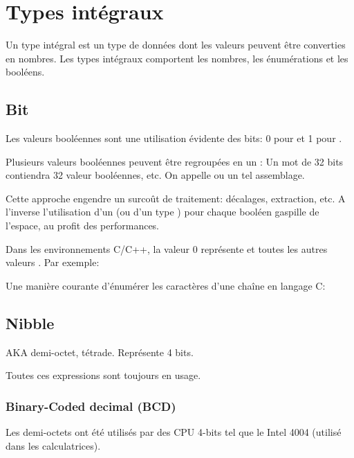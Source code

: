 ﻿%
\section{Types intégraux}

Un type intégral est un type de données dont les valeurs peuvent être converties en nombres.
Les types intégraux comportent les nombres, les énumérations et les booléens.

\subsection{Bit}

Les valeurs booléennes sont une utilisation évidente des bits: 0 pour  et 1 pour .

Plusieurs valeurs booléennes peuvent être regroupées en un : Un mot de 32 bits contiendra 32 valeur booléennes, etc.
On appelle  ou  un tel assemblage.

Cette approche engendre un surcoût de traitement: décalages, extraction, etc.
A l'inverse l'utilisation d'un  (ou d'un type ) pour chaque booléen gaspille de l'espace, au profit des performances.

Dans les environnements C/C++, la valeur 0 représente  et toutes les autres valeurs .
Par exemple:



Une manière courante d'énumérer les caractères d'une chaîne en langage C:



\subsection{Nibble}

\ac{AKA} demi-octet, tétrade.
Représente 4 bits.

Toutes ces expressions sont toujours en usage.

\subsubsection{Binary-Coded decimal (\ac{BCD})}
\label{BCD}


Les demi-octets ont été utilisés par des CPU 4-bits tel que le Intel 4004 (utilisé dans les calculatrices).

